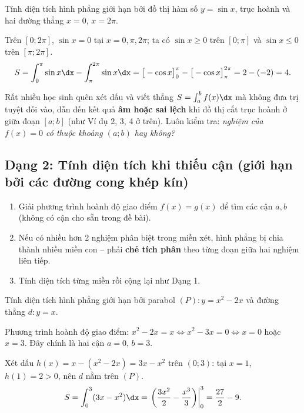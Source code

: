 \begin{hopvidu}
Tính diện tích hình phẳng giới hạn bởi đồ thị hàm số $y=\sin x$, trục hoành và hai đường thẳng $x=0$, $x=2\pi$.
\end{hopvidu}
\begin{loigiai}
Trên $[0;2\pi]$, $\sin x=0$ tại $x=0,\pi,2\pi$; ta có $\sin x\ge0$ trên $[0;\pi]$ và $\sin x\le 0$ trên $[\pi;2\pi]$.
\[
S=\int_0^\pi \sin x\dx - \int_\pi^{2\pi}\sin x\dx = \big[-\cos x\big]_0^\pi - \big[-\cos x\big]_\pi^{2\pi} = 2-(-2)=4.
\]
\end{loigiai}

\begin{hopchuy}
Rất nhiều học sinh quên xét dấu và viết thẳng $S=\int_a^b f(x)\dx$ mà không đưa trị tuyệt đối vào, dẫn đến kết quả \textbf{âm hoặc sai lệch} khi đồ thị cắt trục hoành ở giữa đoạn $[a;b]$ (như Ví dụ 2, 3, 4 ở trên). Luôn kiểm tra: \emph{nghiệm của $f(x)=0$ có thuộc khoảng $(a;b)$ hay không?}
\end{hopchuy}

\newpage
\subsection{Dạng 2: Tính diện tích khi thiếu cận (giới hạn bởi các đường cong khép kín)}

\begin{hopphuongphap}
\begin{enumerate}[leftmargin=1cm]
  \item Giải phương trình hoành độ giao điểm $f(x)=g(x)$ để tìm các cận $a,b$ (không có cận cho sẵn trong đề bài).
  \item Nếu có nhiều hơn 2 nghiệm phân biệt trong miền xét, hình phẳng bị chia thành nhiều miền con -- phải \textbf{chẻ tích phân} theo từng đoạn giữa hai nghiệm liên tiếp.
  \item Tính diện tích từng miền rồi cộng lại như Dạng 1.
\end{enumerate}
\end{hopphuongphap}

\begin{hopvidu}
Tính diện tích hình phẳng giới hạn bởi parabol $(P): y=x^2-2x$ và đường thẳng $d: y=x$.
\end{hopvidu}
\begin{loigiai}
Phương trình hoành độ giao điểm: $x^2-2x=x \Leftrightarrow x^2-3x=0 \Leftrightarrow x=0$ hoặc $x=3$. Đây chính là hai cận $a=0,\,b=3$.

Xét dấu $h(x)=x-(x^2-2x)=3x-x^2$ trên $(0;3)$: tại $x=1$, $h(1)=2>0$, nên $d$ nằm trên $(P)$.
\[
S=\int_0^3 (3x-x^2)\dx = \left.\left(\frac{3x^2}{2}-\frac{x^3}{3}\right)\right|_0^3 = \frac{27}{2}-9.
\]
\end{loigiai}

